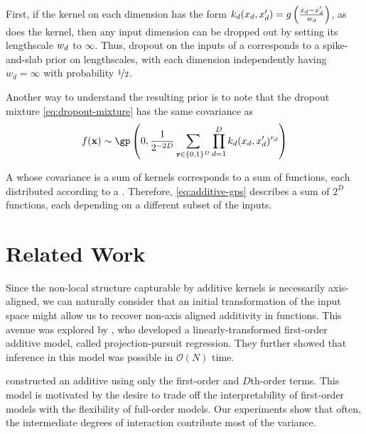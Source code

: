First, if the kernel on each dimension has the form ${k_d(x_d, x_d') = g \left( \frac{x_d - x_d'}{w_d} \right)}$, as does the \kSE{} kernel, then any input dimension can be dropped out by setting its lengthscale $w_d$ to $\infty$.
Thus, dropout on the inputs of a \gp{} corresponds to a spike-and-slab prior on lengthscales, with each dimension independently having $w_d = \infty$ with probability $\nicefrac{1}{2}$.

Another way to understand the resulting prior is to note that the dropout mixture \eqref{eq:dropout-mixture} has the same covariance as
\begin{align}
f(\vx) \sim \textnormal{\gp} \left(0, \frac{1}{2^{-2D}} \sum_{\vr \in \{0,1\}^D}  \prod_{d=1}^D k_d(x_d, x_d')^{r_d} \right)
\label{eq:additive-gps}
\end{align}

A \gp{} whose covariance is a sum of kernels corresponds to a sum of functions, each distributed according to a \gp{}.  Therefore, \eqref{eq:additive-gps} describes a sum of $2^D$ functions, each depending on a different subset of the inputs.



\section{Related Work}

Since the non-local structure capturable by additive kernels is necessarily axis-aligned, we can naturally consider that an initial transformation of the input space might allow us to recover non-axis aligned additivity in functions.
This avenue was explored by \citet{gilboa2013scaling}, who developed a linearly-transformed first-order additive \gp{} model, called projection-pursuit \gp{} regression.  They further showed that inference in this model was possible in $\mathcal{O}(N)$ time.

\citet{plate1999accuracy} constructed an additive \gp{} using only the first-order and $D$th-order terms.
This model is motivated by the desire to trade off the interpretability of first-order models with the flexibility of full-order models.
Our experiments show that often, the intermediate degrees of interaction contribute most of the variance.

